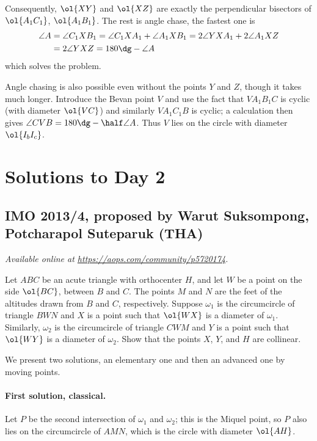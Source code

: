 \documentclass[11pt]{scrartcl}
\begin{document}
Consequently, $\ol{XY}$ and $\ol{XZ}$
are exactly the perpendicular bisectors
of $\ol{A_1 C_1}$, $\ol{A_1 B_1}$.
The rest is angle chase, the fastest one is
\begin{align*}
  \angle A &= \angle C_1 X B_1
  = \angle C_1 X A_1 + \angle A_1 X B_1
  = 2 \angle YXA_1 + 2 \angle A_1 X Z \\
  &= 2 \angle YXZ =  180\dg - \angle A
\end{align*}
which solves the problem.

\begin{remark*}
  Angle chasing is also possible even without
  the points $Y$ and $Z$, though it takes much longer.
  Introduce the Bevan point $V$ and use the fact
  that $VA_1B_1C$ is cyclic (with diameter $\ol{VC}$)
  and similarly $VA_1C_1B$ is cyclic;
  a calculation then gives $\angle CVB = 180\dg - \half \angle A$.
  Thus $V$ lies on the circle with diameter $\ol{I_b I_c}$.
\end{remark*}
\pagebreak

\section{Solutions to Day 2}
\subsection{IMO 2013/4, proposed by Warut Suksompong, Potcharapol Suteparuk (THA)}
\textsl{Available online at \url{https://aops.com/community/p5720174}.}
\begin{mdframed}[style=mdpurplebox,frametitle={Problem statement}]
Let $ABC$ be an acute triangle with orthocenter $H$,
and let $W$ be a point on the side $\ol{BC}$, between $B$ and $C$.
The points $M$ and $N$ are the feet of the altitudes
drawn from $B$ and $C$, respectively.
Suppose $\omega_1$ is the circumcircle of triangle $BWN$
and $X$ is a point such that $\ol{WX}$ is a diameter of $\omega_1$.
Similarly, $\omega_2$ is the circumcircle of triangle $CWM$
and $Y$ is a point such that $\ol{WY}$ is a diameter of $\omega_2$.
Show that the points $X$, $Y$, and $H$ are collinear.
\end{mdframed}
We present two solutions, an elementary one
and then an advanced one by moving points.

\paragraph{First solution, classical.}
Let $P$ be the second intersection of $\omega_1$ and $\omega_2$;
this is the Miquel point, so $P$ also lies on the circumcircle of $AMN$,
which is the circle with diameter $\ol{AH}$.
\end{document}
